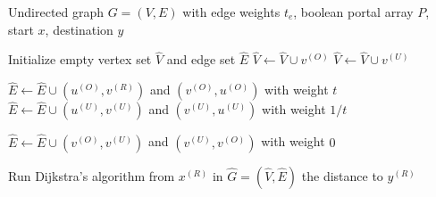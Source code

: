 \documentclass[11pt]{article}
\begin{document}
\begin{algorithm}
\caption{Shortest path with portals}
\begin{algorithmic}[1]
\Require Undirected graph $G=(V,E)$ with edge weights $t_e$, boolean portal array $P$, start $x$, destination $y$

\State Initialize empty vertex set $\hat{V}$ and edge set $\hat{E}$ 
    \State $\hat{V} \leftarrow \hat{V} \cup v^{(O)}$ 
    \State $\hat{V} \leftarrow \hat{V} \cup v^{(U)}$ 
\EndFor

    \State $\hat{E} \leftarrow \hat{E} \cup (u^{(O)},v^{(R)})$ and $(v^{(O)},u^{(O)})$ with weight $t$
    \State $ \hat{E} \leftarrow \hat{E} \cup(u^{(U)},v^{(U)})$ and $(v^{(U)},u^{(U)})$ with weight $1/t$
\EndFor

        \State $\hat{E} \leftarrow \hat{E} \cup(v^{(O)},v^{(U)})$ and $(v^{(U)},v^{(O)})$ with weight $0$
    \EndIf
\EndFor

\State Run Dijkstra's algorithm from $x^{(R)}$ in    $\hat{G} = (\hat{V}, \hat{E})$
\State \Return the distance to $y^{(R)}$
\end{algorithmic}
\end{algorithm}





\end{document}
